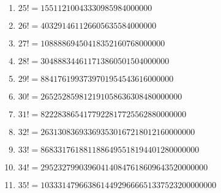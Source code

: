 \begin{enumerate}
\item $25! = 15511210043330985984000000$

\item $26! = 403291461126605635584000000$

\item $27! = 10888869450418352160768000000$

\item $28! = 304888344611713860501504000000$

\item $29! = 8841761993739701954543616000000$

\item $30! = 265252859812191058636308480000000$

\item $31! = 8222838654177922817725562880000000$

\item $32! = 263130836933693530167218012160000000$

\item $33! = 8683317618811886495518194401280000000$

\item $34! = 295232799039604140847618609643520000000$

\item $35! = 10333147966386144929666651337523200000000$
\end{enumerate}
